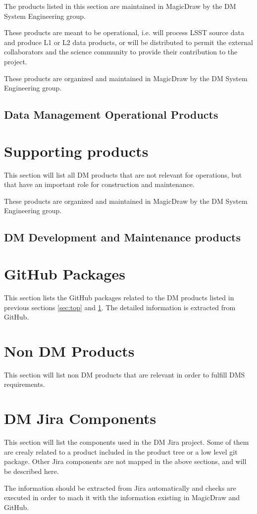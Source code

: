 The products listed in this section are maintained in MagicDraw by the DM System Engineering group. 

These products are meant to be operational, i.e. will process LSST source data and produce L1 or L2 data products, or will be distributed to permit the external collaborators and the science community to provide their contribution to the project.

These products are organized and maintained in MagicDraw by the DM System Engineering group.

\newpage
\subsection{Data Management Operational Products}\label{sec:dmtop}




\newpage
\section{Supporting products}\label{sec:sups}

This section will list all DM products that are not relevant for operations, but that have an important role for construction and maintenance.

These products are organized and maintained in MagicDraw by the DM System Engineering group.
\newpage
\subsection{DM Development and Maintenance products}



\newpage
\section{GitHub Packages}\label{sec:low}

This section lists the GitHub packages related to the DM products listed in previous sections \ref{sec:top} and \ref{sec:sups}.
The detailed information is extracted from GitHub.




\newpage
\section{Non DM Products}\label{sec:nondm}

This section will list non DM products that are relevant in order to fulfill DMS requirements.


\newpage
\section{DM Jira Components}\label{sec:jiracomponents}

This section will list the components used in the DM Jira project.
Some of them are crealy related to a product included in the product tree or a low level git package.
Other Jira components are not mapped in the above sections, and will be described here.

The information should be extracted from Jira automatically and checks are executed in order to mach it with the information existing in MagicDraw and GitHub.
